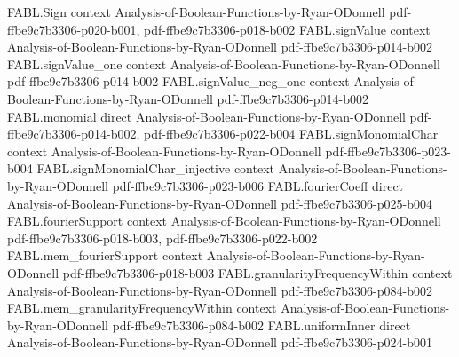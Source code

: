 \begin{theorem}
\label{FABL.FiniteFourierBasis.isSumOfJuntasAtMost_of_fourierCoeff_order}
\leanok
{}
\proofstep
  {FABL.Sign}
  {context}
  {Analysis-of-Boolean-Functions-by-Ryan-ODonnell}
  {pdf-ffbe9c7b3306-p020-b001,
    pdf-ffbe9c7b3306-p018-b002}
\proofstep
  {FABL.signValue}
  {context}
  {Analysis-of-Boolean-Functions-by-Ryan-ODonnell}
  {pdf-ffbe9c7b3306-p014-b002}
\proofstep
  {FABL.signValue_one}
  {context}
  {Analysis-of-Boolean-Functions-by-Ryan-ODonnell}
  {pdf-ffbe9c7b3306-p014-b002}
\proofstep
  {FABL.signValue_neg_one}
  {context}
  {Analysis-of-Boolean-Functions-by-Ryan-ODonnell}
  {pdf-ffbe9c7b3306-p014-b002}
\proofstep
  {FABL.monomial}
  {direct}
  {Analysis-of-Boolean-Functions-by-Ryan-ODonnell}
  {pdf-ffbe9c7b3306-p014-b002,
    pdf-ffbe9c7b3306-p022-b004}
\proofstep
  {FABL.signMonomialChar}
  {context}
  {Analysis-of-Boolean-Functions-by-Ryan-ODonnell}
  {pdf-ffbe9c7b3306-p023-b004}
\proofstep
  {FABL.signMonomialChar_injective}
  {context}
  {Analysis-of-Boolean-Functions-by-Ryan-ODonnell}
  {pdf-ffbe9c7b3306-p023-b006}
\proofstep
  {FABL.fourierCoeff}
  {direct}
  {Analysis-of-Boolean-Functions-by-Ryan-ODonnell}
  {pdf-ffbe9c7b3306-p025-b004}
\proofstep
  {FABL.fourierSupport}
  {context}
  {Analysis-of-Boolean-Functions-by-Ryan-ODonnell}
  {pdf-ffbe9c7b3306-p018-b003,
    pdf-ffbe9c7b3306-p022-b002}
\proofstep
  {FABL.mem_fourierSupport}
  {context}
  {Analysis-of-Boolean-Functions-by-Ryan-ODonnell}
  {pdf-ffbe9c7b3306-p018-b003}
\proofstep
  {FABL.granularityFrequencyWithin}
  {context}
  {Analysis-of-Boolean-Functions-by-Ryan-ODonnell}
  {pdf-ffbe9c7b3306-p084-b002}
\proofstep
  {FABL.mem_granularityFrequencyWithin}
  {context}
  {Analysis-of-Boolean-Functions-by-Ryan-ODonnell}
  {pdf-ffbe9c7b3306-p084-b002}
\proofstep
  {FABL.uniformInner}
  {direct}
  {Analysis-of-Boolean-Functions-by-Ryan-ODonnell}
  {pdf-ffbe9c7b3306-p024-b001}
\proofstep

\end{theorem}
